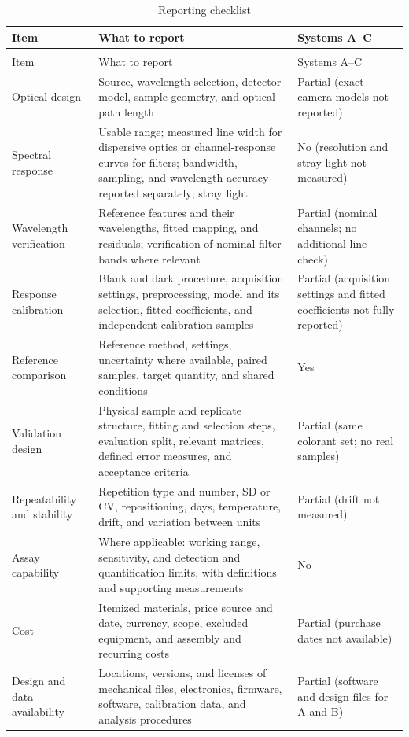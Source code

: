 \begingroup
\setlength{\tabcolsep}{4pt}
\begin{xltabular}{\textwidth}{@{}>{\raggedright\arraybackslash}p{0.20\textwidth} >{\raggedright\arraybackslash}X >{\raggedright\arraybackslash}p{0.20\textwidth}@{}}
\caption{Reporting checklist}\label{tab:checklist}\\
\toprule
Item & What to report & Systems A--C \\
\midrule
\endfirsthead
{} \\
\toprule
Item & What to report & Systems A--C \\
\midrule
\endhead
Optical design & Source, wavelength selection, detector model, sample geometry, and optical path length & Partial (exact camera models not reported) \\
Spectral response & Usable range; measured line width for dispersive optics or channel-response curves for filters; bandwidth, sampling, and wavelength accuracy reported separately; stray light & No (resolution and stray light not measured) \\
Wavelength verification & Reference features and their wavelengths, fitted mapping, and residuals; verification of nominal filter bands where relevant & Partial (nominal channels; no additional-line check) \\
Response calibration & Blank and dark procedure, acquisition settings, preprocessing, model and its selection, fitted coefficients, and independent calibration samples & Partial (acquisition settings and fitted coefficients not fully reported) \\
Reference comparison & Reference method, settings, uncertainty where available, paired samples, target quantity, and shared conditions & Yes \\
Validation design & Physical sample and replicate structure, fitting and selection steps, evaluation split, relevant matrices, defined error measures, and acceptance criteria & Partial (same colorant set; no real samples) \\
Repeatability and stability & Repetition type and number, SD or CV, repositioning, days, temperature, drift, and variation between units & Partial (drift not measured) \\
Assay capability & Where applicable: working range, sensitivity, and detection and quantification limits, with definitions and supporting measurements & No \\
Cost & Itemized materials, price source and date, currency, scope, excluded equipment, and assembly and recurring costs & Partial (purchase dates not available) \\
Design and data availability & Locations, versions, and licenses of mechanical files, electronics, firmware, software, calibration data, and analysis procedures & Partial (software and design files for A and B) \\
\bottomrule

\end{xltabular}
\endgroup
\FloatBarrier

